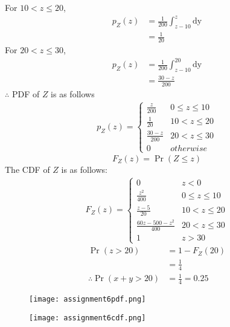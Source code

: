 \documentclass[journal,12pt,twocolumn]{IEEEtran}
\begin{document}
For $ 10 < z \leq 20 $,
\begin{align}
p_Z(z) &= \frac{1}{200}  \int_{z-10}^{z}\mathrm{dy}  \\
        &= \frac{1}{20} \label{8}
\end{align}
For $ 20 < z \leq 30 $,
\begin{align}
p_Z(z) &=\frac{1}{200}  \int_{z-10}^{20}\mathrm{dy}  \\
       &= \frac{30-z}{200} \label{9}
\end{align}
$\therefore$ PDF of $Z$ is as follows
\begin{align}
p_{Z}(z)  = 
\begin{cases}
  \frac{z}{200}& 0 \leq z \leq 10 \\
  \frac{1}{20} & 10 < z \leq 20 \\
  \frac{30-z}{200} & 20 < z \leq 30 \\
  0 & otherwise \label{10}
\end{cases}
\end{align}
\begin{equation}
F_Z(z) = \Pr(Z \leq z) \label{cdf}
\end{equation}
The CDF  of $Z$ is as follows:
\begin{align}
F_Z(z)  = 
\begin{cases}
  0 & z < 0 \\
  \frac{z^2}{400} & 0 \leq z \leq 10 \\
  \frac{z-5}{20} & 10< z \leq 20 \\
  \frac{60z -500 -z^2}{400} & 20< z \leq 30 \\
  1 & z > 30 \label{11}
\end{cases}
\end{align}
\begin{align}
\Pr(z > 20)&= 1- F_Z(20) \\
           &=\frac{1}{4} \label{12} \\
\therefore \Pr(x+y>20)&=\frac{1}{4}=0.25
\end{align}
\begin{figure}[htb!]
\begin{center}
\texttt{[image: assignment6pdf.png]}
\end{center}
\end{figure}

\begin{figure}[htb!]
\begin{center}
\texttt{[image: assignment6cdf.png]}
\end{center}
\end{figure}
\end{document}
